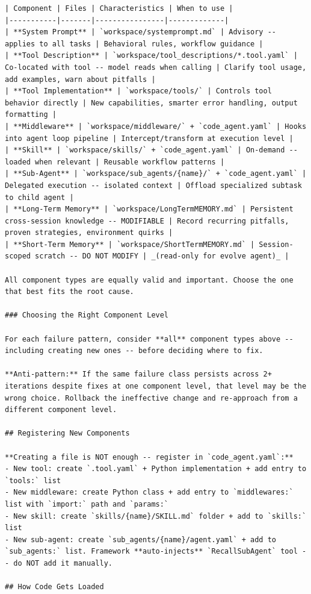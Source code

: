 \begin{tcolorbox}
\begin{lstlisting}
| Component | Files | Characteristics | When to use |
|-----------|-------|----------------|-------------|
| **System Prompt** | `workspace/systemprompt.md` | Advisory -- applies to all tasks | Behavioral rules, workflow guidance |
| **Tool Description** | `workspace/tool_descriptions/*.tool.yaml` | Co-located with tool -- model reads when calling | Clarify tool usage, add examples, warn about pitfalls |
| **Tool Implementation** | `workspace/tools/` | Controls tool behavior directly | New capabilities, smarter error handling, output formatting |
| **Middleware** | `workspace/middleware/` + `code_agent.yaml` | Hooks into agent loop pipeline | Intercept/transform at execution level |
| **Skill** | `workspace/skills/` + `code_agent.yaml` | On-demand -- loaded when relevant | Reusable workflow patterns |
| **Sub-Agent** | `workspace/sub_agents/{name}/` + `code_agent.yaml` | Delegated execution -- isolated context | Offload specialized subtask to child agent |
| **Long-Term Memory** | `workspace/LongTermMEMORY.md` | Persistent cross-session knowledge -- MODIFIABLE | Record recurring pitfalls, proven strategies, environment quirks |
| **Short-Term Memory** | `workspace/ShortTermMEMORY.md` | Session-scoped scratch -- DO NOT MODIFY | _(read-only for evolve agent)_ |

All component types are equally valid and important. Choose the one that best fits the root cause.

### Choosing the Right Component Level

For each failure pattern, consider **all** component types above -- including creating new ones -- before deciding where to fix.

**Anti-pattern:** If the same failure class persists across 2+ iterations despite fixes at one component level, that level may be the wrong choice. Rollback the ineffective change and re-approach from a different component level.

## Registering New Components

**Creating a file is NOT enough -- register in `code_agent.yaml`:**
- New tool: create `.tool.yaml` + Python implementation + add entry to `tools:` list
- New middleware: create Python class + add entry to `middlewares:` list with `import:` path and `params:`
- New skill: create `skills/{name}/SKILL.md` folder + add to `skills:` list
- New sub-agent: create `sub_agents/{name}/agent.yaml` + add to `sub_agents:` list. Framework **auto-injects** `RecallSubAgent` tool -- do NOT add it manually.

## How Code Gets Loaded


\end{lstlisting}
\end{tcolorbox}
